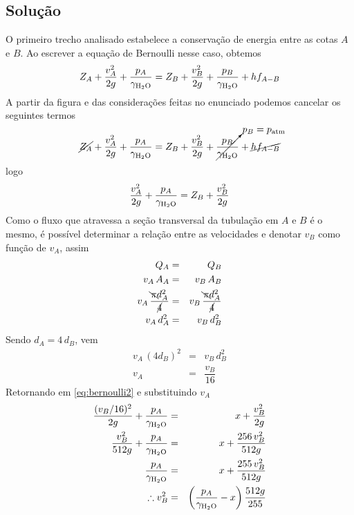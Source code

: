 \documentclass[a4paper, 12pt, brazilian]{article}
\begin{document}
	\subsection{Solução}
	O primeiro trecho analisado estabelece a conservação de energia entre as cotas $A$ e $B$. Ao escrever a equação de Bernoulli nesse caso, obtemos
	\begin{equation}
		Z_{A}+\dfrac{v_{A}^{2}}{2g}+\dfrac{p_{A}}{\gamma_{\ce{H2O}}}=Z_{B}+\dfrac{v_{B}^{2}}{2g}+\dfrac{p_{B}}{\gamma_{\ce{H2O}}}+hf_{A-B}
	\end{equation}
	A partir da figura e das considerações feitas no enunciado podemos cancelar os seguintes termos
	\begin{equation}
	\cancel{Z_{A}}+\dfrac{v_{A}^{2}}{2g}+\dfrac{p_{A}}{\gamma_{\ce{H2O}}}=Z_{B}+\dfrac{v_{B}^{2}}{2g}+\cancelto{p_{B}=p_{\text{atm}}}{\dfrac{p_{B}}{\gamma_{\ce{H2O}}}}+\cancel{hf_{A-B}}
	\end{equation}
	logo
	\begin{equation}
	\label{eq:bernoulli2}
	\dfrac{v_{A}^{2}}{2g}+\dfrac{p_{A}}{\gamma_{\ce{H2O}}}=Z_{B}+\dfrac{v_{B}^{2}}{2g}
	\end{equation}
	Como o fluxo que atravessa a seção transversal da tubulação em $A$ e $B$ é o mesmo, é possível determinar a relação entre as velocidades e denotar $v_{B}$ como função de $v_{A}$, assim
	\begin{eqnarray}
		Q_{A}&=&Q_{B}\\
		v_{A}\,A_{A}&=&v_{B}\,A_{B}\\
		v_{A}\,\dfrac{\bcancel{\pi}d_{A}^{2}}{\cancel{4}}&=&v_{B}\,\dfrac{\bcancel{\pi} d_{A}^{2}}{\cancel{4}}\\
		v_{A}\,d_{A}^{2}&=&v_{B}\,d_{B}^{2}
	\end{eqnarray}
	Sendo $d_{A}=4\,d_{B}$, vem
	\begin{eqnarray}
		v_{A}\,(4d_{B})^{2}&=&v_{B}\,d_{B}^{2}\\
		v_{A}&=&\dfrac{v_{B}}{16}
	\end{eqnarray}
	Retornando em \eqref{eq:bernoulli2} e substituindo $v_{A}$
	\begin{eqnarray}
		\dfrac{(v_{B}/16)^{2}}{2g}+\dfrac{p_{A}}{\gamma_{\ce{H2O}}}&=&x+\dfrac{v_{B}^{2}}{2g}\\
		\dfrac{v_{B}^{2}}{512g}+\dfrac{p_{A}}{\gamma_{\ce{H2O}}}&=&x+\dfrac{256\,v_{B}^{2}}{512g}\\
		\dfrac{p_{A}}{\gamma_{\ce{H2O}}}&=&x+\dfrac{255\,v_{B}^{2}}{512g}\\
		\therefore v_{B}^{2}&=&\left(\dfrac{p_{A}}{\gamma_{\ce{H2O}}}-x\right)\dfrac{512g}{255}\label{eq:squaredvb}
	\end{eqnarray}
\end{document}
